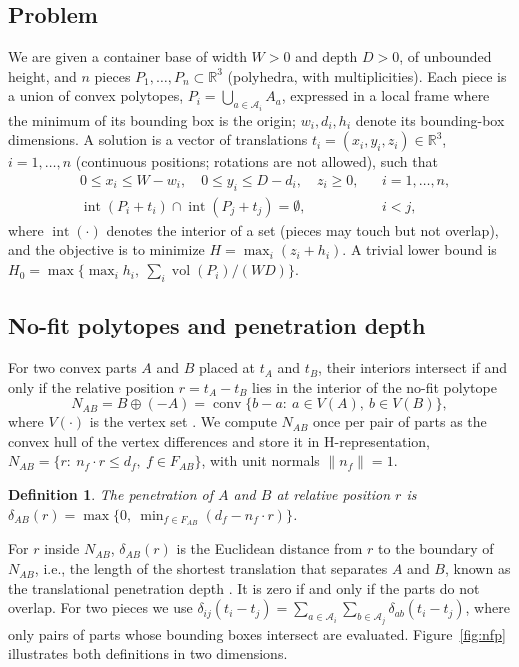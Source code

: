 \documentclass[preprint,12pt,authoryear]{elsarticle}
\newtheorem{definition}{Definition}
\begin{document}
\subsection{Problem}
We are given a container base of width $W>0$ and depth $D>0$, of unbounded height, and $n$ pieces
$P_1,\dots,P_n\subset\mathbb{R}^3$ (polyhedra, with multiplicities). Each piece is a union of convex polytopes,
$P_i=\bigcup_{a\in\mathcal{A}_i}A_a$, expressed in a local frame where the minimum of its bounding box is the
origin; $w_i,d_i,h_i$ denote its bounding-box dimensions. A solution is a vector of translations
$t_i=(x_i,y_i,z_i)\in\mathbb{R}^3$, $i=1,\dots,n$ (continuous positions; rotations are not allowed), such that
\begin{align}
& 0\le x_i\le W-w_i,\quad 0\le y_i\le D-d_i,\quad z_i\ge 0, && i=1,\dots,n,\\
& \operatorname{int}(P_i+t_i)\cap\operatorname{int}(P_j+t_j)=\emptyset, && i<j,
\end{align}
where $\operatorname{int}(\cdot)$ denotes the interior of a set (pieces may touch but not overlap), and the
objective is to minimize $H=\max_i(z_i+h_i)$. A trivial lower bound is
$H_0=\max\{\max_i h_i,\ \sum_i\operatorname{vol}(P_i)/(WD)\}$.

\subsection{No-fit polytopes and penetration depth}
For two convex parts $A$ and $B$ placed at $t_A$ and $t_B$, their interiors intersect if and only if the relative
position $r=t_A-t_B$ lies in the interior of the no-fit polytope
\begin{equation}
N_{AB}=B\oplus(-A)=\operatorname{conv}\{b-a:\ a\in V(A),\ b\in V(B)\},
\end{equation}
where $V(\cdot)$ is the vertex set \citep{bennell2008}. We compute $N_{AB}$ once per pair of parts as the convex
hull of the vertex differences and store it in H-representation, $N_{AB}=\{r:\ n_f\cdot r\le d_f,\ f\in F_{AB}\}$,
with unit normals $\|n_f\|=1$.

\begin{definition}
The \emph{penetration} of $A$ and $B$ at relative position $r$ is
$\delta_{AB}(r)=\max\{0,\ \min_{f\in F_{AB}}(d_f-n_f\cdot r)\}$.
\end{definition}

For $r$ inside $N_{AB}$, $\delta_{AB}(r)$ is the Euclidean distance from $r$ to the boundary of $N_{AB}$, i.e.,
the length of the shortest translation that separates $A$ and $B$, known as the translational penetration
depth \citep{cameron1986,agarwal2000}. It is
zero if and only if the parts do not overlap. For two pieces we use
$\delta_{ij}(t_i-t_j)=\sum_{a\in\mathcal{A}_i}\sum_{b\in\mathcal{A}_j}\delta_{ab}(t_i-t_j)$, where only pairs of parts
whose bounding boxes intersect are evaluated. Figure~\ref{fig:nfp} illustrates both definitions in two dimensions.
\end{document}
